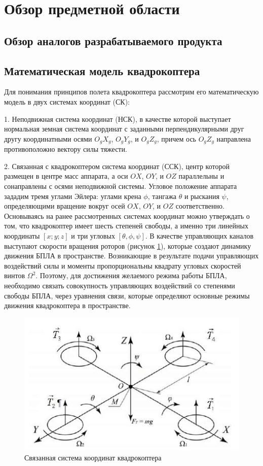 
\section{Обзор предметной области}

\subsection{Обзор аналогов разрабатываемого продукта}
\subsection{Математическая модель квадрокоптера}

Для понимания принципов полета квадрокоптера рассмотрим его математическую модель в двух системах координат (СК):

1. Неподвижная система координат (НСК), в качестве которой выступает нормальная земная система координат с заданными перпендикулярными друг другу координатными осями \(O_{g}X_{g}\), \(O_{g}Y_{g}\), и \(O_{g}Z_{g}\), причем ось \(O_{g}Z_{g}\) направлена противоположно вектору силы тяжести.

2. Связанная с квадрокоптером система координат (ССК), центр которой размещен в центре масс аппарата, а оси \(OX\), \(OY\), и \(OZ\) параллельны и сонаправлены с осями неподвижной системы. Угловое положение аппарата зададим тремя углами Эйлера: углами крена \(\phi\), тангажа \(\theta\) и рыскания \(\psi\), определяющими вращение вокруг осей \(OX\), \(OY\), и \(OZ\) соответственно. Основываясь на ранее рассмотренных системах координат можно утверждать о том, что квадрокоптер имеет шесть степеней свободы, а именно три линейных координаты \([x; y; z ]\) и три угловых \([\theta, \phi, \psi]\). В качестве управляющих каналов выступают скорости вращения роторов (рисунок \ref{fig:ris1}), которые создают динамику движения БПЛА в пространстве. Возникающие в результате подачи управляющих воздействий силы и моменты пропорциональны квадрату угловых скоростей винтов \(\Omega^2\). Поэтому, для достижения желаемого режима работы БПЛА, необходимо связать совокупность управляющих воздействий со степенями свободы БПЛА, через уравнения связи, которые определяют основные режимы движения квадрокоптера в пространстве.
\begin{figure}[H]
	\centering
	\includegraphics[width=0.5\linewidth]{../RW/pics/ris1}
	\caption{Связанная система координат квадрокоптера
	}
	\label{fig:ris1}
\end{figure}

